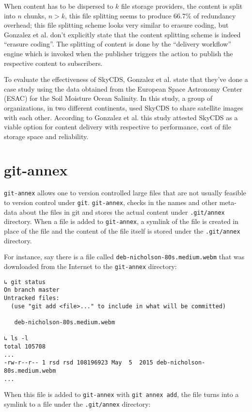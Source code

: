 When content has to be dispersed to $k$ file storage providers, the
content is split into $n$ chunks, $n > k$, this file splitting seems
to produce 66.7\% of redundancy overhead\cite{skycds}; this file
splitting scheme looks very similar to erasure coding, but Gonzalez et
al. don't explicitly state that the content splitting scheme is indeed
``erasure coding''. The splitting of content is done by the ``delivery
workflow'' engine which is invoked when the publisher triggers the
action to publish the respective content to subscribers.

To evaluate the effectiveness of SkyCDS, Gonzalez et al. state that
they've done a case study using the data obtained from the European
Space Astronomy Center (ESAC) for the Soil Moisture Ocean Salinity. In
this study, a group of organizations, in two different continents,
used SkyCDS to share satellite images with each other. According to
Gonzalez et al. this study attested SkyCDS as a viable option for
content delivery with respective to performance, cost of file storage
space and reliability.

\section{git-annex}\label{2-gitannex-sec}

\verb+git-annex+ allows one to version controlled large files that are
not usually feasible to version control under
\verb+git+\cite{program:git}. \verb+git-annex+, checks in the names
and other meta-data about the files in git and stores the actual
content under \verb+.git/annex+ directory. When a file is added to
\verb+git-annex+, a symlink of the file is created in place of the
file and the content of the file itself is stored under the
\verb+.git/annex+ directory.

For instance, say there is a file called
\verb+deb-nicholson-80s.medium.webm+ that was downloaded from the
Internet to the \verb+git-annex+ directory:

\begin{verbatim}
↳ git status
On branch master
Untracked files:
  (use "git add <file>..." to include in what will be committed)

   deb-nicholson-80s.medium.webm

↳ ls -l
total 105708
...
-rw-r--r-- 1 rsd rsd 108196923 May  5  2015 deb-nicholson-80s.medium.webm
...
\end{verbatim}

When this file is added to \verb+git-annex+ with \verb+git annex add+,
the file turns into a symlink to a file under the \verb+.git/annex+
directory:

